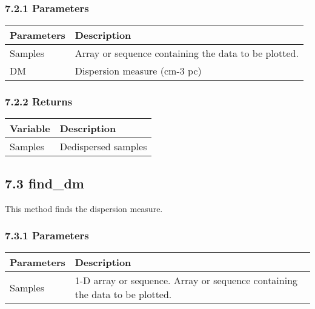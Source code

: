 \documentclass[]{article}
\begin{document}
\subsubsection{7.2.1 Parameters}\label{parameters-3}

\begin{longtable}[]{@{}ll@{}}
\toprule
Parameters & Description\tabularnewline
\midrule
\endhead
Samples & Array or sequence containing the data to be
plotted.\tabularnewline
DM & Dispersion measure (cm-3 pc)\tabularnewline
\bottomrule
\end{longtable}

\subsubsection{7.2.2 Returns}\label{returns-1}

\begin{longtable}[]{@{}ll@{}}
\toprule
Variable & Description\tabularnewline
\midrule
\endhead
Samples & Dedispersed samples\tabularnewline
\bottomrule
\end{longtable}

\subsection{7.3 find\_dm}\label{find_dm}

This method finds the dispersion measure.

\subsubsection{7.3.1 Parameters}\label{parameters-4}

\begin{longtable}[]{@{}ll@{}}
\toprule
\begin{minipage}[b]{0.41\columnwidth}\raggedright\strut
Parameters\strut
\end{minipage} & \begin{minipage}[b]{0.41\columnwidth}\raggedright\strut
Description\strut
\end{minipage}\tabularnewline
\midrule
\endhead
\begin{minipage}[t]{0.41\columnwidth}\raggedright\strut
Samples\strut
\end{minipage} & \begin{minipage}[t]{0.41\columnwidth}\raggedright\strut
1-D array or sequence. Array or sequence containing the data to be
plotted.\strut
\end{minipage}\tabularnewline
\bottomrule
\end{longtable}
\end{document}
